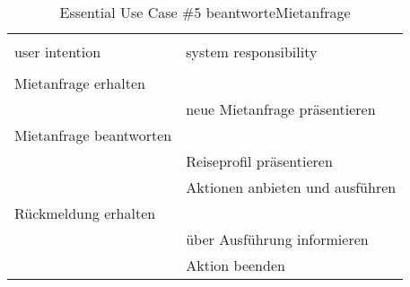 \begin{table}[H]
\caption{Essential Use Case \#5 beantworteMietanfrage }
\centering
\begin{tabular}{l l}
\\ [-0.5ex]

\hline\hline
\\ [-0.5ex]
user intention & system responsibility
\\ [1.5ex]
\hline
\\ [-0.5ex]
Mietanfrage erhalten       &                                 \\[1ex]
                     & neue Mietanfrage präsentieren            \\[1ex]
Mietanfrage beantworten    &                                 \\[1ex] 
                     & Reiseprofil präsentieren              \\[1ex]
                     & Aktionen anbieten und ausführen          \\[1ex]
Rückmeldung erhalten    &                                 \\[1ex]
                     & über Ausführung informieren           \\[1ex]
                     & Aktion beenden                     \\[1ex]

\hline
\end{tabular}
\label{tab:mietanfrage}
\end{table}


